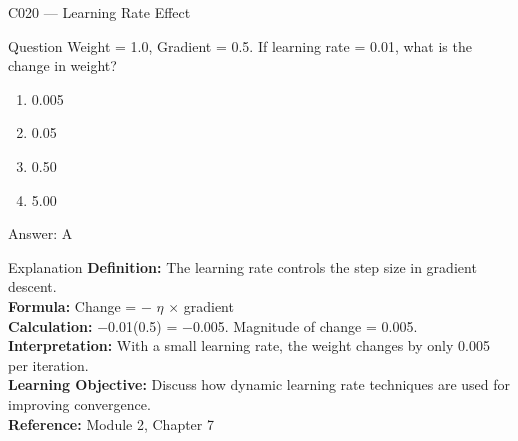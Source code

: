 \documentclass[aspectratio=169,8pt]{beamer}
\begin{document}
	\begin{frame}{C020 --- Learning Rate Effect}
		\begin{block}{Question}
			Weight = 1.0, Gradient = 0.5. If learning rate = 0.01, what is the change in weight?
			\begin{enumerate}
				\item 0.005
				\item 0.05
				\item 0.50
				\item 5.00
			\end{enumerate}
		\end{block}
		\begin{exampleblock}{Answer: A}\end{exampleblock}
		\begin{block}{Explanation}
			\textbf{Definition:} The learning rate controls the step size in gradient descent.\\
			\textbf{Formula:} Change = $-$ $\eta$ $\times$ gradient\\
			\textbf{Calculation:} $-$0.01(0.5) = $-$0.005. Magnitude of change = 0.005.\\
			\textbf{Interpretation:} With a small learning rate, the weight changes by only 0.005 per iteration.\\
			\textbf{Learning Objective:} Discuss how dynamic learning rate techniques are used for improving convergence.\\
			\textbf{Reference:} Module 2, Chapter 7
		\end{block}
	\end{frame}
	
\end{document}
